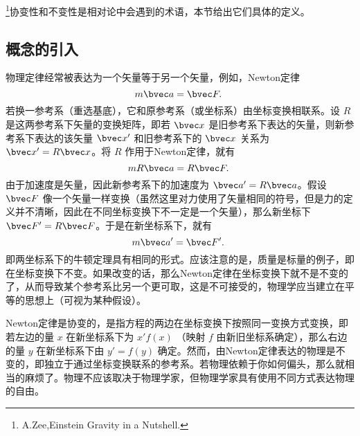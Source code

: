 
\footnote{A.Zee,Einstein Gravity in a Nutshell.}协变性和不变性是相对论中会遇到的术语，本节给出它们具体的定义。
\subsection{概念的引入}
物理定律经常被表达为一个矢量等于另一个矢量，例如，Newton定律 
\begin{equation}
m\bvec a=\bvec F.~
\end{equation}
若换一参考系（重选基底），它和原参考系（或坐标系）由坐标变换相联系。设 $R$ 是这两参考系下矢量的变换矩阵，即若 $\bvec x$ 是旧参考系下表达的矢量，则新参考系下表达的该矢量 $\bvec x'$ 和旧参考系下的 $\bvec x$ 关系为 $\bvec x'=R\bvec x$。将 $R$ 作用于Newton定律，就有
\begin{equation}
mR\bvec a=R\bvec F.~
\end{equation}
由于加速度是矢量，因此新参考系下的加速度为 $\bvec a'=R\bvec a$。假设 $\bvec F$ 像一个矢量一样变换（虽然这里对力使用了矢量相同的符号，但是力的定义并不清晰，因此在不同坐标变换下不一定是一个矢量），那么新坐标下 $\bvec F'=R\bvec F$。于是在新坐标系下，就有
\begin{equation}
m\bvec a'=\bvec F'.~
\end{equation}
即两坐标系下的牛顿定理具有相同的形式。应该注意的是，质量是标量的例子，即在坐标变换下不变。如果改变的话，那么Newton定律在坐标变换下就不是不变的了，从而导致某个参考系比另一个更可取，这是不可接受的，物理学应当建立在平等的思想上（可视为某种假设）。

Newton定律是协变的，是指方程的两边在坐标变换下按照同一变换方式变换，即若左边的量 $x$ 在新坐标系下为 $x'f(x)$ （映射 $f$ 由新旧坐标系确定），那么右边的量 $y$ 在新坐标系下由 $y'=f(y)$ 确定。然而，由Newton定律表达的物理是不变的，即独立于通过坐标变换联系的参考系。若物理依赖于你如何偏头，那么就相当的麻烦了。物理不应该取决于物理学家，但物理学家具有使用不同方式表达物理的自由。

